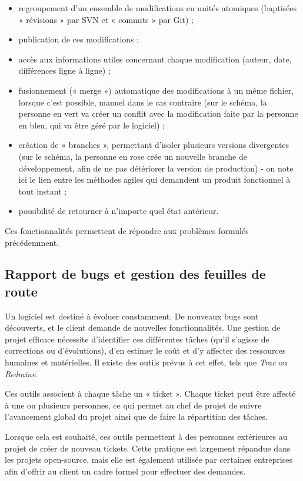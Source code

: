 \begin{itemize}
\item regroupement d’un ensemble de modifications en unités atomiques (baptisées « révisions » par SVN et « commits » par Git) ;
\item publication de ces modifications ;
\item accès aux informations utiles concernant chaque modification (auteur, date, différences ligne à ligne) ;
\item fusionnement (« merge ») automatique des modifications à un même fichier, lorsque c’est possible, manuel dans le cas contraire (sur le schéma, la personne en vert va créer un conflit avec la modification faite par la personne en bleu, qui va être géré par le logiciel) ;
\item création de « branches », permettant d’isoler plusieurs versions divergentes (sur le schéma, la personne en rose crée un nouvelle branche de développement, afin de ne pas détériorer la version de production) - on note ici le lien entre les méthodes agiles qui demandent un produit fonctionnel à tout instant ;
\item possibilité de retourner à n’importe quel état antérieur.
\end{itemize}

Ces fonctionnalités permettent de répondre aux problèmes formulés précédemment.

\subsection{Rapport de bugs et gestion des feuilles de route}

Un logiciel est destiné à évoluer constamment. De nouveaux bugs sont découverts, et le client demande de nouvelles fonctionnalités. Une gestion de projet efficace nécessite d’identifier ces différentes tâches (qu’il s’agisse de corrections ou d’évolutions), d’en estimer le coût et d’y affecter des ressources humaines et matérielles. Il existe des outils prévus à cet effet, tels que \textit{Trac} ou \textit{Redmine}.

Ces outils associent à chaque tâche un « ticket ». Chaque ticket peut être affecté à une ou plusieurs personnes, ce qui permet au chef de projet de suivre l’avancement global du projet ainsi que de faire la répartition des tâches.

Lorsque cela est souhaité, ces outils permettent à des personnes extérieures au projet de créer de nouveau tickets. Cette pratique est largement répandue dans les projets open-source, mais elle est également utilisée par certaines entreprises afin d’offrir au client un cadre formel pour effectuer des demandes.

